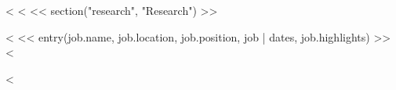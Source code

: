 <%
<%
<< section("research", "Research") >>
\begin{description}
<%
<< entry(job.name, job.location, job.position, job | dates, job.highlights) >>
<%
\end{description}

<%
